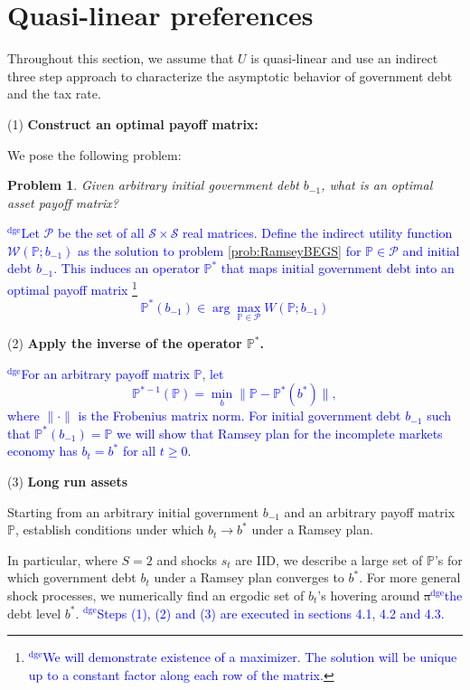 \documentclass[12pt]{article}
\newcommand{\dge}[1]{\textcolor{blue}{$^{\textrm{dge}}${#1}}}
\newtheorem{problem}[theorem]{Problem}
\begin{document}
\section{Quasi-linear preferences}

Throughout this section, we assume that $U$ is quasi-linear and use an indirect three step approach to  characterize  the asymptotic behavior of government  debt and the tax rate.



\noindent (1) \textbf{Construct  an optimal payoff matrix:}

We pose the following problem:
\begin{problem}\label{prob:PPoperator}
 Given arbitrary initial government debt $b_{-1}$, what is an optimal asset payoff matrix?
\end{problem}
\noindent  \dge{Let $\mathcal P$ be the set of all $\mathcal S\times \mathcal S$ real matrices.  Define the indirect utility function $\mathcal W(\mathbb P;b_{-1})$ as the solution to problem \ref{prob:RamseyBEGS} for $\mathbb P \in \mathcal P$ and initial debt $b_{-1}$.  This induces an operator $\mathbb P^*$ that maps initial government debt into an optimal payoff matrix \footnote{\dge{We will demonstrate existence of a maximizer.  The solution will be unique up to a constant factor along each row of the matrix.}}
\[
	\mathbb P^*(b_{-1}) \in \arg\max_{\mathbb P\in \mathcal P} W(\mathbb P; b_{-1})
\] }



\noindent (2) \textbf{Apply the inverse of the operator $\mathbb{P}^*$.}

\dge{For an arbitrary payoff matrix $\mathbb{P}$,  let
\begin{equation}\label{eqn:invPoperator}\mathbb{P}^{* -1}(\mathbb{P}) =\min_{b}\|\mathbb{P}-\mathbb{P}^*(b^*)\|,
\end{equation}where $\|\cdot\|$ is the Frobenius matrix norm.  For initial government debt $b_{-1}$ such that $\mathbb P^*(b_{-1}) = \mathbb P$ we will show that Ramsey plan for the incomplete markets economy has $b_t = b^*$ for all $t \geq 0$.}


\noindent (3) \textbf{Long run assets}

Starting from an arbitrary initial government $b_{-1}$ and an arbitrary payoff matrix $\mathbb{P}$,  establish conditions under  which $b_t \to b^*$ under a Ramsey plan.


In particular, where $S=2$ and shocks $s_t$ are IID,  we describe a large set of  $\mathbb{P}$'s for which government debt $b_t$  under a Ramsey plan converges to $b^*$.  For more general shock processes, we numerically find  an ergodic set of $b_t$'s hovering around \st{a}\dge{the} debt level $b^*$.  \dge{Steps (1), (2) and (3) are executed in sections 4.1, 4.2 and 4.3.}    
\end{document}

